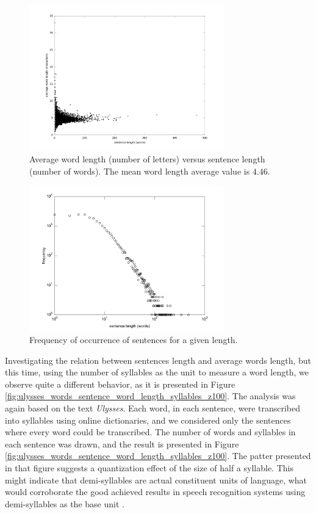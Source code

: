 \begin{figure}[h!]
\centering
\includegraphics[width=0.75\textwidth]{images/ulysses_words_sentence_word_length.png}
\caption{Average word length (number of letters) versus sentence length (number of words).
The mean word length average value is $4.46$.}
\label{fig:ulysses_words_sentence_word_length}
\end{figure} 


\begin{figure}[h!]
\centering
\includegraphics[width=0.75\textwidth]{images/ulysses_words_sentence_word_length_freq.pdf}
\caption{Frequency of occurrence of sentences for a given length.}
\label{fig:ulysses_words_sentence_word_length_freq}
\end{figure} 


Investigating the relation between sentences length and average words length, 
but this time, using the number of syllables as the unit to measure a word length,
we observe quite a different behavior, as it is presented in Figure \ref{fig:ulysses_words_sentence_word_length_syllables_z100}.
The analysis was again based on the text \textit{Ulysses}. Each word, in each sentence,
were transcribed into syllables using online dictionaries, and we considered only the sentences
where every word could be transcribed. The number of words and syllables in each sentence
was drawn, and the result is presented in Figure \ref{fig:ulysses_words_sentence_word_length_syllables_z100}.
The patter presented in that figure suggests a quantization effect of the size of half a syllable.
This might indicate that demi-syllables are actual constituent units of language, what would
corroborate the good achieved results in speech recognition systems using demi-syllables as 
the base unit \citep{yoshida1989}.

